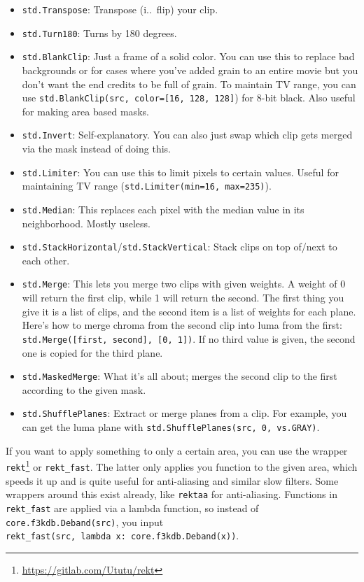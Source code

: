 \documentclass{scrartcl}
\begin{document}
\begin{itemize}
\item \texttt{std.Transpose}: Transpose (i.\@e.\ flip) your clip.
\item \texttt{std.Turn180}: Turns by 180 degrees.
\item \texttt{std.BlankClip}: Just a frame of a solid color.  You can use this to replace bad backgrounds or for cases where you've added grain to an entire movie but you don't want the end credits to be full of grain.  To maintain TV range, you can use \texttt{std.BlankClip(src, color=[16, 128, 128]}) for 8-bit black. Also useful for making area based masks.
\item \texttt{std.Invert}: Self-explanatory.  You can also just swap which clip gets merged via the mask instead of doing this.
\item \texttt{std.Limiter}: You can use this to limit pixels to certain values. Useful for maintaining TV range (\texttt{std.Limiter(min=16, max=235)}).
\item \texttt{std.Median}: This replaces each pixel with the median value in its neighborhood.  Mostly useless.
\item \texttt{std.StackHorizontal}/\texttt{std.StackVertical}: Stack clips on top of/next to each other.
\item \texttt{std.Merge}: This lets you merge two clips with given weights.  A weight of 0 will return the first clip, while 1 will return the second.  The first thing you give it is a list of clips, and the second item is a list of weights for each plane.  Here's how to merge chroma from the second clip into luma from the first: \texttt{std.Merge([first, second], [0, 1])}.  If no third value is given, the second one is copied for the third plane.
\item \texttt{std.MaskedMerge}: What it's all about; merges the second clip to the first according to the given mask.
\item \texttt{std.ShufflePlanes}: Extract or merge planes from a clip.  For example, you can get the luma plane with \texttt{std.ShufflePlanes(src, 0, vs.GRAY)}.
\end{itemize}

If you want to apply something to only a certain area, you can use the wrapper \texttt{rekt}\footnote{\url{https://gitlab.com/Ututu/rekt}} or \texttt{rekt\_fast}.  The latter only applies you function to the given area, which speeds it up and is quite useful for anti-aliasing and similar slow filters.  Some wrappers around this exist already, like \texttt{rektaa} for anti-aliasing. Functions in \texttt{rekt\_fast} are applied via a lambda function, so instead of\\ \texttt{core.f3kdb.Deband(src)}, you input\\ \texttt{rekt\_fast(src, lambda x: core.f3kdb.Deband(x))}.
\end{document}

